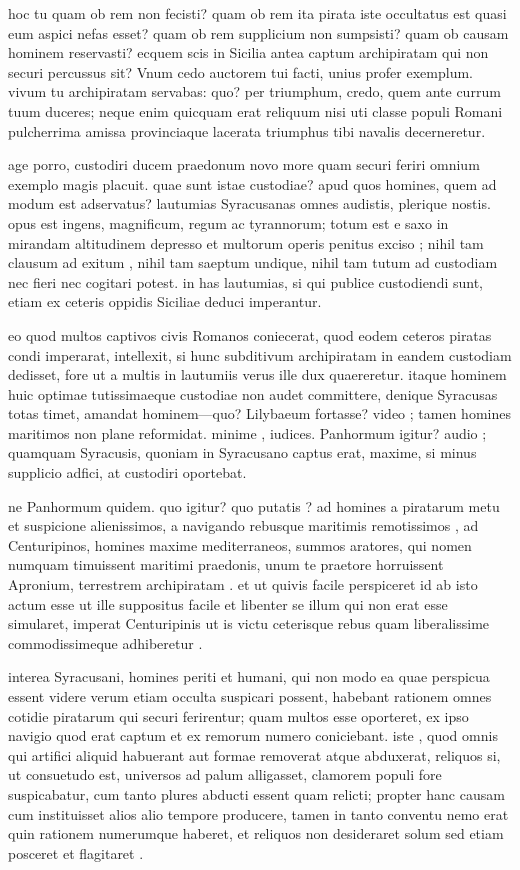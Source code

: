  hoc tu quam ob rem non fecisti? quam ob rem ita pirata iste occultatus est quasi eum aspici nefas esset? quam ob rem supplicium non sumpsisti? quam ob causam hominem reservasti? ecquem scis in Sicilia antea captum archipiratam qui non securi percussus sit? Vnum cedo auctorem tui facti, unius profer exemplum. vivum tu archipiratam servabas: quo? per triumphum, credo, quem ante currum tuum duceres; neque enim quicquam erat reliquum nisi uti classe populi Romani pulcherrima amissa provinciaque lacerata triumphus tibi navalis decerneretur.

 age porro, custodiri ducem praedonum novo more quam securi feriri omnium exemplo magis placuit. quae sunt istae custodiae? apud quos homines, quem ad modum est adservatus? lautumias Syracusanas omnes audistis, plerique nostis. opus est ingens, magnificum, regum ac tyrannorum; totum est e saxo in mirandam altitudinem depresso et multorum operis penitus exciso ; nihil tam clausum ad exitum , nihil tam saeptum undique, nihil tam tutum ad custodiam nec fieri nec cogitari potest. in has lautumias, si qui publice custodiendi sunt, etiam ex ceteris oppidis Siciliae deduci imperantur.

 eo quod multos captivos civis Romanos coniecerat, quod eodem ceteros piratas condi imperarat, intellexit, si hunc subditivum archipiratam in eandem custodiam dedisset, fore ut a multis in lautumiis verus ille dux quaereretur. itaque hominem huic optimae tutissimaeque custodiae non audet committere, denique Syracusas totas timet, amandat hominem—quo? Lilybaeum fortasse? video ; tamen homines maritimos non plane reformidat. minime , iudices. Panhormum igitur? audio ; quamquam Syracusis, quoniam in Syracusano captus erat, maxime, si minus supplicio adfici, at custodiri oportebat.

 ne Panhormum quidem. quo igitur? quo putatis ? ad homines a piratarum metu et suspicione alienissimos, a navigando rebusque maritimis remotissimos , ad Centuripinos, homines maxime mediterraneos, summos aratores, qui nomen numquam timuissent maritimi praedonis, unum te praetore horruissent Apronium, terrestrem archipiratam . et ut quivis facile perspiceret id ab isto actum esse ut ille suppositus facile et libenter se illum qui non erat esse simularet, imperat Centuripinis ut is victu ceterisque rebus quam liberalissime commodissimeque adhiberetur .

 interea Syracusani, homines periti et humani, qui non modo ea quae perspicua essent videre verum etiam occulta suspicari possent, habebant rationem omnes cotidie piratarum qui securi ferirentur; quam multos esse oporteret, ex ipso navigio quod erat captum et ex remorum numero coniciebant. iste , quod omnis qui artifici aliquid habuerant aut formae removerat atque abduxerat, reliquos si, ut consuetudo est, universos ad palum alligasset, clamorem populi fore suspicabatur, cum tanto plures abducti essent quam relicti; propter hanc causam cum instituisset alios alio tempore producere, tamen in tanto conventu nemo erat quin rationem numerumque haberet, et reliquos non desideraret solum sed etiam posceret et flagitaret .

